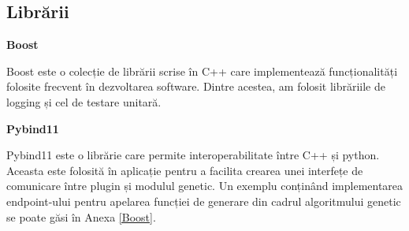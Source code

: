     \subsection{Librării}
        \noindent \textbf{Boost} \par
        \noindent Boost este o colecție de librării scrise în C++ care implementează funcționalități folosite frecvent în dezvoltarea software. Dintre acestea, am folosit librăriile de logging și cel de testare unitară. \par 
        \noindent \textbf{Pybind11} \par
        \noindent Pybind11 este o librărie care permite interoperabilitate între C++ și python. Aceasta este folosită în aplicație pentru a facilita crearea unei interfețe de comunicare între plugin și modulul genetic. Un exemplu conținând implementarea endpoint-ului pentru apelarea funcției de generare din cadrul algoritmului genetic se poate găsi în Anexa \ref{Boost}. \par
    
